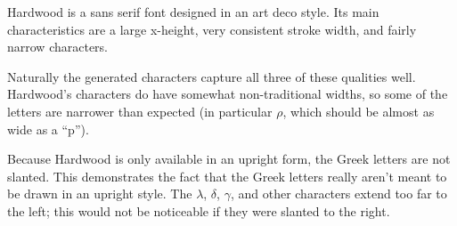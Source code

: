 
Hardwood is a sans serif font designed in an art deco style. Its main
characteristics are a large x-height, very consistent stroke width, and fairly
narrow characters.

Naturally the generated characters capture all three of these qualities well.
Hardwood's characters do have somewhat non-traditional widths, so some of the
letters are narrower than expected (in particular $\rho$, which should be almost
as wide as a ``p'').

Because Hardwood is only available in an upright form, the Greek letters are not
slanted. This demonstrates the fact that the Greek letters really aren't meant
to be drawn in an upright style. The $\lambda$, $\delta$, $\gamma$, and other
characters extend too far to the left; this would not be noticeable if they were
slanted to the right.
